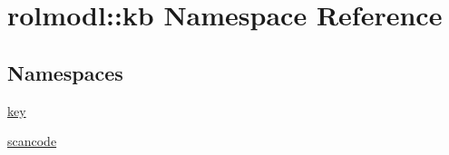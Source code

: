\hypertarget{namespacerolmodl_1_1kb}{}\section{rolmodl\+::kb Namespace Reference}
\label{namespacerolmodl_1_1kb}
\subsection*{Namespaces}
\begin{DoxyCompactItemize}
\item 
 \mbox{\hyperlink{namespacerolmodl_1_1kb_1_1key}{key}}
\item 
 \mbox{\hyperlink{namespacerolmodl_1_1kb_1_1scancode}{scancode}}
\end{DoxyCompactItemize}
